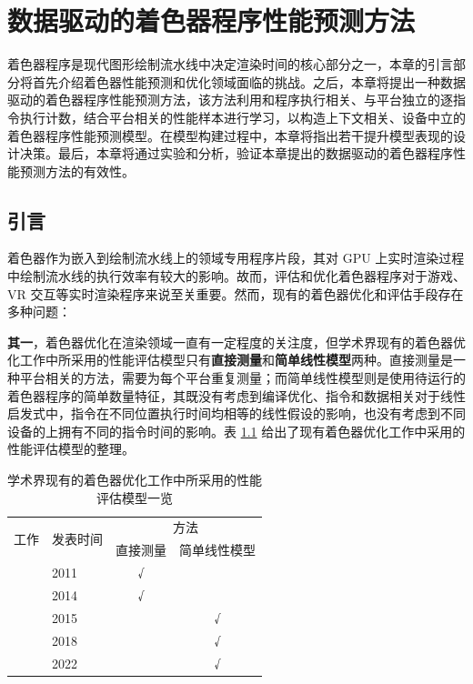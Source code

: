 
\chapter{数据驱动的着色器程序性能预测方法}

{\amend 着色器程序是现代图形绘制流水线中决定渲染时间的核心部分之一，本章的引言部分将首先介绍着色器性能预测和优化领域面临的挑战。之后，}本章将提出一种数据驱动的着色器程序性能预测方法，{\amend 该方法利用和程序执行相关、与平台独立的逐指令执行计数，结合平台相关的性能样本进行学习，以构造上下文相关、设备中立的着色器程序性能预测模型。在模型构建过程中，本章将指出若干提升模型表现的设计决策。最后，本章将通过实验和分析，验证本章提出的数据驱动的着色器程序性能预测方法的有效性。}

\section{引言}

\label{sec:ch4_intro}

{\amend 着色器作为嵌入到绘制流水线上的领域专用程序片段，其对 GPU 上实时渲染过程中绘制流水线的执行效率有较大的影响。故而，评估和优化着色器程序对于游戏、VR 交互等实时渲染程序来说至关重要。然而，现有的着色器优化和评估手段存在多种问题：

{\bf 其一}，着色器优化在渲染领域一直有一定程度的关注度，但学术界现有的着色器优化工作中所采用的性能评估模型只有{\bf 直接测量}和{\bf 简单线性模型}两种。直接测量是一种平台相关的方法，需要为每个平台重复测量；而简单线性模型则是使用待运行的着色器程序的简单数量特征，其既没有考虑到编译优化、指令和数据相关对于线性启发式中，指令在不同位置执行时间均相等的线性假设的影响，也没有考虑到不同设备的上拥有不同的指令时间的影响。表 \ref{table:shader_optim_work_costs} 给出了现有着色器优化工作中采用的性能评估模型的整理。
}

\begin{table}[h]
    \centering
    \caption{学术界现有的着色器优化工作中所采用的性能评估模型一览}
    \label{table:shader_optim_work_costs}
    \begin{tabular}{l|l|cc}
    \toprule
    \multirow{2}{*}{工作}             & \multirow{2}{*}{发表时间} & \multicolumn{2}{c}{方法} \\
                                    &                     & 直接测量       & 简单线性模型      \\
    \midrule
    \citet{10.1145/2070781.2024186} & 2011                & √          &           \\
    \citet{10.1145/2661229.2661276} & 2014                & √          &           \\
    \citet{10.1145/2816795.2818104} & 2015                &            & √         \\
    \citet{10.1111/cgf.13482}       & 2018                &            & √         \\
    \citet{10.1145/3528233.3530722} & 2022                &            & √         \\
    \bottomrule
    \end{tabular}
\end{table}

